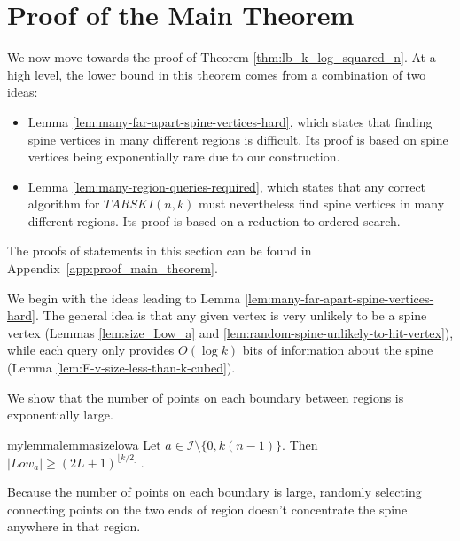 \documentclass[11pt]{article}
\begin{document}

\section{Proof of the Main Theorem} \label{sec:proof_main_theorem}

We now move towards the proof of Theorem \ref{thm:lb_k_log_squared_n}.
At a high level, the lower bound in  this theorem comes from a combination of two ideas:
\begin{itemize}
    \item Lemma \ref{lem:many-far-apart-spine-vertices-hard}, which states that finding spine vertices in many different regions is difficult. Its proof is based on spine vertices being exponentially rare due to our construction.
    \item Lemma \ref{lem:many-region-queries-required}, which states that any correct algorithm for $TARSKI(n, k)$ must nevertheless find spine vertices in many different regions. Its proof is based on a reduction to ordered search.
\end{itemize}

The proofs of statements in this section can be found in Appendix~\ref{app:proof_main_theorem}.

We begin with the ideas leading to Lemma \ref{lem:many-far-apart-spine-vertices-hard}.  The general idea is that any given vertex is very unlikely to be a spine vertex (Lemmas \ref{lem:size_Low_a} and \ref{lem:random-spine-unlikely-to-hit-vertex}), while each query only provides $O(\log k)$ bits of information about the spine (Lemma \ref{lem:F-v-size-less-than-k-cubed}).

We show that the number of points on each boundary between regions is exponentially large.

\begin{restatable}{mylemma}{lemmasizelowa}
\label{lem:size_Low_a}
    Let $a \in \mathcal{I} \setminus \{0, k(n-1)\}$. Then 
$|Low_a| \geq (2L+1)^{\lfloor k/2 \rfloor}\,.$
\end{restatable}

Because the number of points on each boundary is large, randomly selecting connecting points on the two ends of region doesn't concentrate the spine anywhere in that region.
\end{document}
